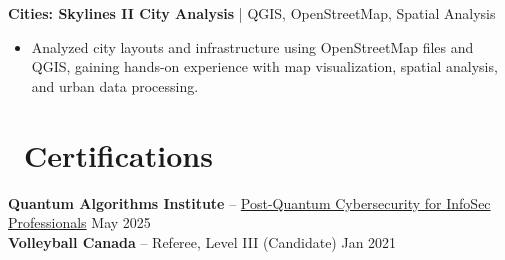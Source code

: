 \documentclass[11pt]{article}
\begin{document}
\vspace{6pt}

\textbf{Cities: Skylines II City Analysis} | QGIS, OpenStreetMap, Spatial Analysis
\begin{itemize}
    \item Analyzed city layouts and infrastructure using OpenStreetMap files and QGIS, gaining hands-on experience with map visualization, spatial analysis, and urban data processing.
\end{itemize}



\vspace{10pt}

\section*{\faCertificate\ Certifications}
\textbf{Quantum Algorithms Institute} -- \href{https://badges.qai.ca/36877903-1956-4db4-af32-25893765b228#acc.Iu8jGSAs}{Post-Quantum Cybersecurity for InfoSec Professionals} \hfill May 2025 \\
\textbf{Volleyball Canada} -- Referee, Level III (Candidate) \hfill Jan 2021
\end{document}
